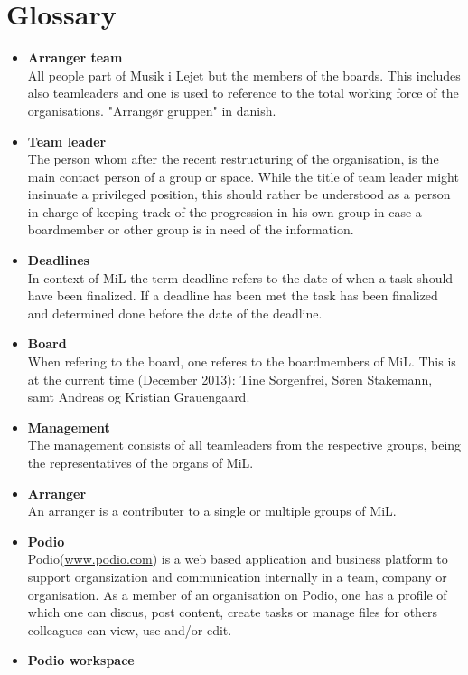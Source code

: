 \section{Glossary}
\begin{itemize}
	\item \textbf{Arranger team}\\
	All people part of Musik i Lejet but the members of the boards. This includes also teamleaders and one is used to reference to the total working force of the organisations. "Arrangør gruppen" in danish.
	\item \textbf{Team leader}\\
	The person whom after the recent restructuring of the organisation, is the main contact person of a group or space. While the title of team leader might insinuate a privileged position, this should rather be understood as a person in charge of keeping track of the progression in his own group in case a boardmember or other group is in need of the information.
	\item \textbf{Deadlines}\\
	In context of MiL the term deadline refers to the date of when a task should have been finalized. If a deadline has been met the task has been finalized and determined done before the date of the deadline.
	\item \textbf{Board}\\
	When refering to the board, one referes to the boardmembers of MiL. This is at the current time (December 2013): Tine Sorgenfrei, Søren Stakemann, samt Andreas og Kristian Grauengaard.
	\item \textbf{Management}\\
	The management consists of all teamleaders from the respective groups, being the representatives of the organs of MiL.
	\item \textbf{Arranger}\\
	An arranger is a contributer to a single or multiple groups of MiL.
	\item \textbf{Podio}\\
	Podio(\href{www.podio.com}{www.podio.com}) is a web based application and business platform to support organsization and communication internally in a team, company or organisation. As a member of an organisation on Podio, one has a profile of which one can discus, post content, create tasks or manage files for others colleagues can view, use and/or edit.
	\item \textbf{Podio workspace} \\

\end{itemize}
